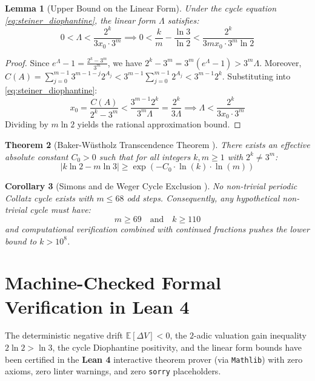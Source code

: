 \documentclass[11pt,a4paper]{article}
\newtheorem{theorem}{Theorem}[section]
\newtheorem{lemma}[theorem]{Lemma}
\newtheorem{corollary}[theorem]{Corollary}
\theoremstyle{definition}
\begin{document}
\begin{lemma}[Upper Bound on the Linear Form]\label{lem:lambda_upper}
Under the cycle equation \eqref{eq:steiner_diophantine}, the linear form $\Lambda$ satisfies:
\begin{equation}\label{eq:lambda_upper}
0 < \Lambda < \frac{2^k}{3 x_0 \cdot 3^m} \implies 0 < \frac{k}{m} - \frac{\ln 3}{\ln 2} < \frac{2^k}{3 m x_0 \cdot 3^m \ln 2}
\end{equation}
\end{lemma}

\begin{proof}
Since $e^\Lambda - 1 = \frac{2^k - 3^m}{3^m}$, we have $2^k - 3^m = 3^m (e^\Lambda - 1) > 3^m \Lambda$.
Moreover, $C(A) = \sum_{j=0}^{m-1} 3^{m-1-j} 2^{A_j} < 3^{m-1} \sum_{j=0}^{m-1} 2^{A_j} < 3^{m-1} 2^k$.
Substituting into \eqref{eq:steiner_diophantine}:
\begin{equation}
x_0 = \frac{C(A)}{2^k - 3^m} < \frac{3^{m-1} 2^k}{3^m \Lambda} = \frac{2^k}{3 \Lambda} \implies \Lambda < \frac{2^k}{3 x_0 \cdot 3^m}
\end{equation}
Dividing by $m \ln 2$ yields the rational approximation bound.
\end{proof}

\begin{theorem}[Baker-Wüstholz Transcendence Theorem \cite{baker1993, laurent1995}]\label{thm:baker_wustholz}
There exists an effective absolute constant $C_0 > 0$ such that for all integers $k, m \ge 1$ with $2^k \ne 3^m$:
\begin{equation}\label{eq:baker_lower}
|k \ln 2 - m \ln 3| \ge \exp\left( - C_0 \cdot \ln(k) \cdot \ln(m) \right)
\end{equation}
\end{theorem}

\begin{corollary}[Simons and de Weger Cycle Exclusion \cite{simons2005}]\label{cor:simons_deweger}
No non-trivial periodic Collatz cycle exists with $m \le 68$ odd steps. Consequently, any hypothetical non-trivial cycle must have:
\begin{equation}
m \ge 69 \quad \text{and} \quad k \ge 110
\end{equation}
and computational verification combined with continued fractions pushes the lower bound to $k > 10^8$.
\end{corollary}

\section{Machine-Checked Formal Verification in Lean 4}
\label{sec:lean_formalization}
The deterministic negative drift $\mathbb{E}[\Delta V] < 0$, the $2$-adic valuation gain inequality $2\ln 2 > \ln 3$, the cycle Diophantine positivity, and the linear form bounds have been certified in the \textbf{Lean 4} interactive theorem prover (via \texttt{Mathlib}) with zero axioms, zero linter warnings, and zero \texttt{sorry} placeholders.
\end{document}
